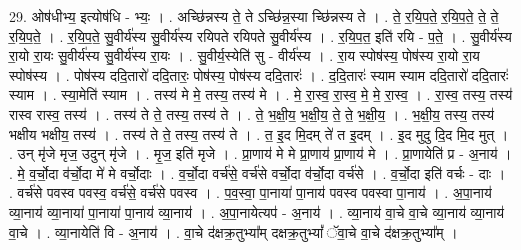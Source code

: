 \documentclass[17pt]{extarticle}
\begin{document}
29. ओष॑धीभ्य॒ इत्योष॑धि - भ्यः॒ । . अच्छि॑न्नस्य ते॒ ते ऽच्छि॑न्न॒स्या च्छि॑न्नस्य ते । . ते॒ र॒यि॒प॒ते॒ र॒यि॒प॒ते॒ ते॒ ते॒ र॒यि॒प॒ते॒ । . र॒यि॒प॒ते॒ सु॒वीर्य॑स्य सु॒वीर्य॑स्य रयिपते रयिपते सु॒वीर्य॑स्य । . र॒यि॒प॒त॒ इति॑ रयि - प॒ते॒ । . सु॒वीर्य॑स्य रा॒यो रा॒यः सु॒वीर्य॑स्य सु॒वीर्य॑स्य रा॒यः । . सु॒वीर्य॒स्येति॑ सु - वीर्य॑स्य । . रा॒य स्पोष॑स्य॒ पोष॑स्य रा॒यो रा॒य स्पोष॑स्य । . पोष॑स्य ददि॒तारो॑ ददि॒तारः॒ पोष॑स्य॒ पोष॑स्य ददि॒तारः॑ । . द॒दि॒तारः॑ स्याम स्याम ददि॒तारो॑ ददि॒तारः॑ स्याम । . स्या॒मेति॑ स्याम । . तस्य॑ मे मे॒ तस्य॒ तस्य॑ मे । . मे॒ रा॒स्व॒ रा॒स्व॒ मे॒ मे॒ रा॒स्व॒ । . रा॒स्व॒ तस्य॒ तस्य॑ रास्व रास्व॒ तस्य॑ । . तस्य॑ ते ते॒ तस्य॒ तस्य॑ ते । . ते॒ भ॒क्षी॒य॒ भ॒क्षी॒य॒ ते॒ ते॒ भ॒क्षी॒य॒ । . भ॒क्षी॒य॒ तस्य॒ तस्य॑ भक्षीय भक्षीय॒ तस्य॑ । . तस्य॑ ते ते॒ तस्य॒ तस्य॑ ते । . त॒ इ॒द मि॒दम् ते॑ त इ॒दम् । . इ॒द मुदु दि॒द मि॒द मुत् । . उन् मृ॑जे मृज॒ उदुन् मृ॑जे । . मृ॒ज॒ इति॑ मृजे । . प्रा॒णाय॑ मे मे प्रा॒णाय॑ प्रा॒णाय॑ मे । . प्रा॒णायेति॑ प्र - अ॒नाय॑ । . मे॒ व॒र्चो॒दा व॑र्चो॒दा मे॑ मे वर्चो॒दाः । . व॒र्चो॒दा वर्च॑से॒ वर्च॑से वर्चो॒दा व॑र्चो॒दा वर्च॑से । . व॒र्चो॒दा इति॑ वर्चः - दाः । . वर्च॑से पवस्व पवस्व॒ वर्च॑से॒ वर्च॑से पवस्व । . प॒व॒स्वा॒ पा॒नाया॑ पा॒नाय॑ पवस्व पवस्वा पा॒नाय॑ । . अ॒पा॒नाय॑ व्या॒नाय॑ व्या॒नाया॑ पा॒नाया॑ पा॒नाय॑ व्या॒नाय॑ । . अ॒पा॒नायेत्यप॑ - अ॒नाय॑ । . व्या॒नाय॑ वा॒चे वा॒चे व्या॒नाय॑ व्या॒नाय॑ वा॒चे । . व्या॒नायेति॑ वि - अ॒नाय॑ । . वा॒चे द॑क्षक्र॒तुभ्या᳚म् दक्षक्र॒तुभ्यां᳚ ॅवा॒चे वा॒चे द॑क्षक्र॒तुभ्या᳚म् । \newline
\end{document}
